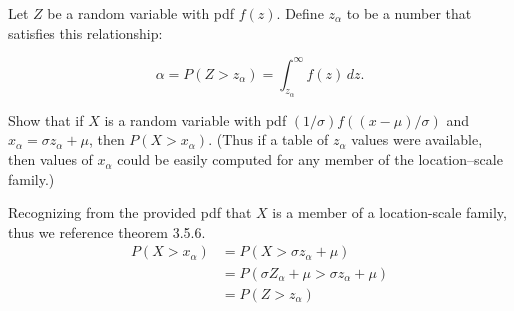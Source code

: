 \documentclass[12pt,letterpaper]{exam}
\begin{document}
\begin{questions}
\begin{solution}
		
	\end{solution}
	
	\setcounter{question}{37}
	\question 
	Let \(Z\) be a random variable with pdf \(f(z)\). Define \(z_\alpha\) to be a number that satisfies this relationship:
	
	\[\alpha = P(Z>z_\alpha) = \int_{z_\alpha}^{\infty} f(z) \,dz.\]
	
	Show that if \(X\) is a random variable with pdf \((1/\sigma)f((x-\mu)/\sigma)\) and \(x_\alpha=\sigma z_\alpha+\mu\),
	then \(P(X>x_\alpha)\).	(Thus if a table of \(z_\alpha\) values were available, then values of \(x_\alpha\) 
	could be easily computed for any member of the location–scale family.)
	
	\begin{solution}
		Recognizing from the provided pdf that \(X\) is a member of a location-scale family,
		thus we reference theorem 3.5.6.
		\begin{align*}
			P(X>x_\alpha)
			&= P(X> \sigma z_\alpha+\mu ) \\
			&= P(\sigma Z_\alpha+\mu> \sigma z_\alpha+\mu ) \\
			&= P(Z> z_\alpha ) \\
		\end{align*}
	\end{solution}
	

\end{questions}
\end{document}
